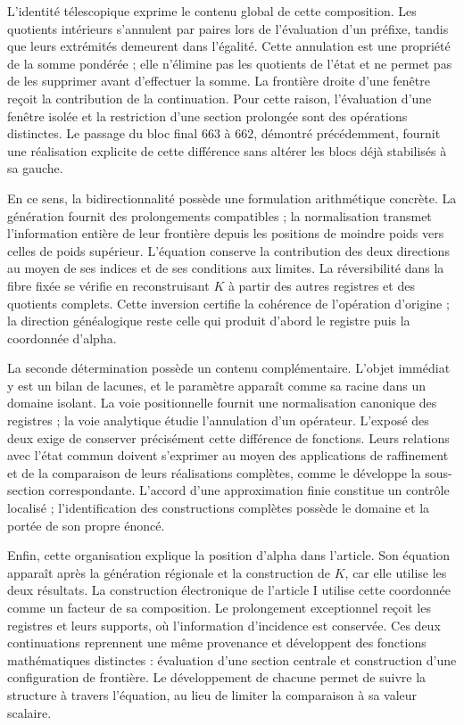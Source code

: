 L'identité télescopique exprime le contenu global de cette composition.
Les quotients intérieurs s'annulent par paires lors de l'évaluation d'un préfixe,
tandis que leurs extrémités demeurent dans l'égalité. Cette annulation est une
propriété de la somme pondérée ; elle n'élimine pas les quotients de l'état et
ne permet pas de les supprimer avant d'effectuer la somme. La frontière droite d'une
fenêtre reçoit la contribution de la continuation. Pour cette raison,
l'évaluation d'une fenêtre isolée et la restriction d'une section
prolongée sont des opérations distinctes. Le passage du bloc final $663$ à
$662$, démontré précédemment, fournit une réalisation explicite de cette
différence sans altérer les blocs déjà stabilisés à sa gauche.

En ce sens, la bidirectionnalité possède une formulation arithmétique
concrète. La génération fournit des prolongements compatibles ; la
normalisation transmet l'information entière de leur frontière depuis les
positions de moindre poids vers celles de poids supérieur. L'équation conserve la
contribution des deux directions au moyen de ses indices et de ses conditions
aux limites. La réversibilité dans la fibre fixée se vérifie en reconstruisant
$K$ à partir des autres registres et des quotients complets. Cette
inversion certifie la cohérence de l'opération d'origine ; la direction
généalogique reste celle qui produit d'abord le registre puis
la coordonnée d'alpha.

La seconde détermination possède un contenu complémentaire. L'objet
immédiat y est un bilan de lacunes, et le paramètre apparaît comme
sa racine dans un domaine isolant. La voie positionnelle fournit une
normalisation canonique des registres ; la voie analytique étudie l'annulation
d'un opérateur. L'exposé des deux exige de conserver précisément
cette différence de fonctions. Leurs relations avec l'état commun doivent
s'exprimer au moyen des applications de raffinement et de la comparaison de
leurs réalisations complètes, comme le développe la sous-section
correspondante. L'accord d'une approximation finie constitue un
contrôle localisé ; l'identification des constructions complètes
possède le domaine et la portée de son propre énoncé.

Enfin, cette organisation explique la position d’alpha dans l’article.
Son équation apparaît après la génération régionale et la construction
de $K$, car elle utilise les deux résultats. La construction électronique de
l’article I utilise cette coordonnée comme un facteur de sa composition. Le prolongement
exceptionnel reçoit les registres et leurs supports, où l’information
d’incidence est conservée. Ces deux continuations reprennent une même
provenance et développent des fonctions mathématiques distinctes : évaluation d’une
section centrale et construction d’une configuration de frontière.
Le développement de chacune permet de suivre la structure à travers
l’équation, au lieu de limiter la comparaison à sa valeur scalaire.
